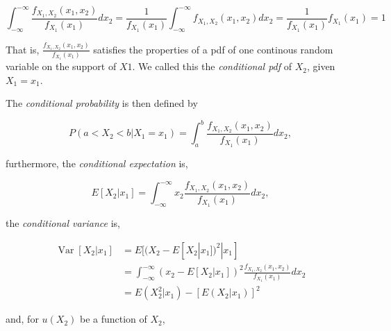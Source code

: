 \documentclass{article}
\begin{document}
                \begin{equation*}
                     \int_{ -\infty }^{ -\infty } \frac{ f_{X_{1}, X_{2}}(x_{1}, x_{2}) }{ f_{X_{1}}( x_{1}) } d x_{2}
                        = \frac{1}{ f_{X_{1}}(x_{1}) } \int_{ -\infty }^{ -\infty } f_{X_{1}, X_{2}}(x_{1}, x_{2}) d x_{2}
                        = \frac{1}{ f_{X_{1}}(x_{1}) } f_{X_{1}}(x_{1}) = 1
                \end{equation*}

                That is, $ \frac{ f_{X_{1}, X_{2}}(x_{1}, x_{2}) }{ f_{X_{1}}(
                x_{1}) } $ satisfies the properties of a pdf of one continous
                random variable on the support of $ X1 $. We called this the
                \textit{conditional pdf} of $ X_{2} $, given $ X_{1} = x_{1} $.

                The \textit{conditional probability} is then defined by

                \begin{equation*}
                     P( a < X_{2} < b | X_{1} = x_{1}) = \int_{a}^{b} \frac{
                     f_{X_{1}, X_{2}}(x_{1}, x_{2}) }{ f_{X_{1}}( x_{1}) } d x_{2},
                \end{equation*}

                furthermore, the \textit{conditional expectation} is,

                \begin{equation*}
                    E[X_{2} | x_{1}] = \int_{-\infty}^{-\infty} x_{2} \frac{
                     f_{X_{1}, X_{2}}(x_{1}, x_{2}) }{ f_{X_{1}}( x_{1}) } d x_{2},
                \end{equation*}

                the \textit{conditional variance} is,

                \begin{align*}
                    \operatorname{Var}[X_{2} | x_{1}]
                        &= E[(X_{2} -E[X_{2} | x_{1}])^2 | x_{1}] \\
                        &= \int_{-\infty}^{-\infty} (x_{2} - E[X_{2} | x_{1}])^2 \frac{
                         f_{X_{1}, X_{2}}(x_{1}, x_{2}) }{ f_{X_{1}}( x_{1}) } d x_{2} \\
                        &= E(X_{2}^{2}|x_{1}) - \left[ E(X_{2}|x_{1}) \right]^{2}
                \end{align*}

                and, for $ u(X_{2}) $ be a function of $ X_{2} $,
\end{document}
